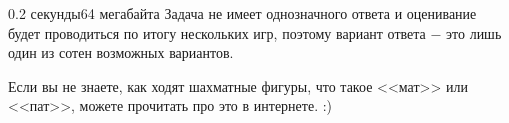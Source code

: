 \begin{problem}{}{}{}{0.2 секунды}{64 мегабайта}
\Note
Задача не имеет однозначного ответа и оценивание будет проводиться по итогу нескольких игр,
поэтому вариант ответа $-$ это лишь один из сотен возможных вариантов.

Если вы не знаете, как ходят шахматные фигуры, что такое <<мат>> или <<пат>>, можете прочитать про это в интернете. :) 
\end{problem}

